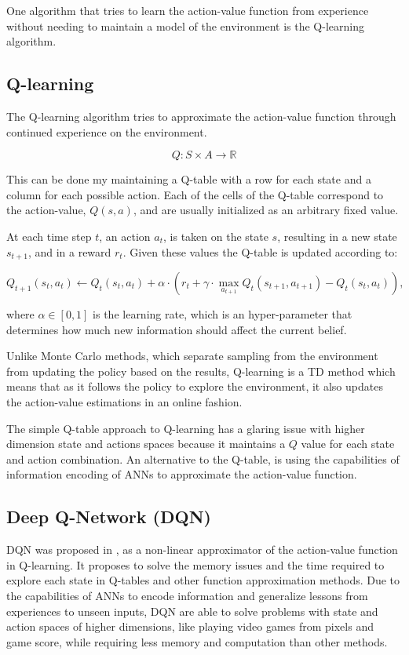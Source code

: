 One algorithm that tries to learn the action-value function from experience without needing to maintain a model of the environment is the Q-learning algorithm.
\subsection{Q-learning}
\noindent The Q-learning algorithm tries to approximate the action-value function through continued experience on the environment.

\begin{equation}
    Q:S\times A \rightarrow \mathbb{R}
\end{equation}\label{Qval}

This can be done my maintaining a Q-table with a row for each state and a column for each possible action. Each of the cells of the Q-table correspond to the action-value, $Q(s,a)$, and are usually initialized as an arbitrary fixed value. 

At each time step $t$, an action $a_t$, is taken on the state $s$, resulting in a new state $s_{t+1}$, and in a reward $r_t$. Given these values the Q-table is updated according to: 

\begin{equation}
    Q_{t+1}(s_t, a_t) \leftarrow Q_{t}(s_t, a_t) + \alpha \cdot (r_t + \gamma \cdot \max\limits_{a_{t+1}}Q_t(s_{t+1}, a_{t+1}) - Q_t(s_t, a_t)) ,
\end{equation}

where $\alpha \in [0, 1]$ is the learning rate, which is an hyper-parameter that determines how much new information should affect the current belief.

Unlike Monte Carlo methods, which separate sampling from the environment from updating the policy based on the results, Q-learning is a \acrfull{TD} method which means that as it follows the policy to explore the environment, it also updates the action-value estimations in an online fashion.

The simple Q-table approach to Q-learning has a glaring issue with higher dimension state and actions spaces because it maintains a $Q$ value for each state and action combination. An alternative to the Q-table, is using the capabilities of information encoding of \acrfull{ANNs} to approximate the action-value function.

\subsection{Deep Q-Network (DQN)}
\noindent \acrshort{DQN} was proposed in \cite{DQN}, as a non-linear approximator of the action-value function in Q-learning. It proposes to solve the memory issues and the time required to explore each state in Q-tables and other function approximation methods. Due to the capabilities of \acrshort{ANNs} to encode information and generalize lessons from experiences to unseen inputs, \acrshort{DQN} are able to solve problems with state and action spaces of higher dimensions, like playing video games from pixels and game score, while requiring less memory and computation than other methods.


